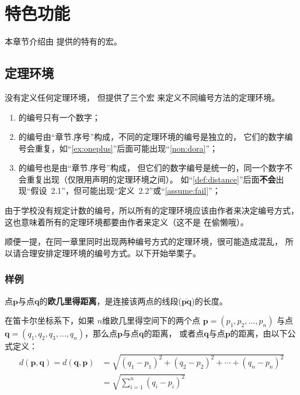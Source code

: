 \chapter{特色功能}

本章节介绍由 \nuaathesis{} 提供的特有的宏。

\section{定理环境}

\nuaathesis{} 没有定义任何定理环境，
但提供了三个宏  来定义不同编号方法的定理环境。
\begin{enumerate}
  \item {} 的编号只有一个数字；
  \item {} 的编号由“章节.序号”构成，不同的定理环境的编号是独立的，
  它们的数字编号会重复，如“\autoref{ex:oneplus}”后面可能出现“\autoref{non:dora}”；
  \item {} 的编号也是由“章节.序号”构成，
  但它们的数字编号是统一的，同一个数字不会重复出现（仅限用声明的定理环境之间）。
  如“\autoref{def:distance}”后面\textbf{不会}出现“假设~2.1”，但可能出现“定义~2.2”或“\autoref{assume:fail}”；
\end{enumerate}

由于学校没有规定计数的编号，所以所有的定理环境应该由作者来决定编号方式，
这也意味着所有的定理环境都要由作者来定义（这不是 \nuaathesis{} 在偷懒哦）。

顺便一提，在同一章里同时出现两种编号方式的定理环境，很可能造成混乱，
所以请合理安排定理环境的编号方式。以下开始举栗子。

\subsection*{样例}

\begin{definition}[欧几里得距离]
\label{def:distance}
点$\mathbf{p}$与点$\mathbf{q}$的\textbf{欧几里得距离}，是连接该两点的线段($\overline{\mathbf{pq}}$)的长度。

在笛卡尔坐标系下，如果 $n$维欧几里得空间下的两个点 $\mathbf{p}=(p_1, p_2, \dots, p_n)$ 与点
$\mathbf{q} = (q_1, q_2, q_3, \dots, q_n)$，那么点$\mathbf{p}$与点$\mathbf{q}$的距离，
或者点$\mathbf{q}$与点$\mathbf{p}$的距离，由以下公式定义：
\begin{align}
\label{equ:1}
d(\mathbf{p},\mathbf{q}) = d(\mathbf{q},\mathbf{p}) & = \sqrt{(q_1-p_1)^2 + (q_2-p_2)^2 + \cdots + (q_n-p_n)^2} \\
\label{equ:2}
& = \sqrt{\sum_{i=1}^n (q_i-p_i)^2}
\end{align}
\end{definition}

